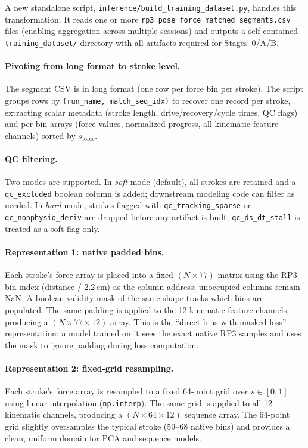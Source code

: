 \documentclass[11pt]{article}
\begin{document}
A new standalone script, \texttt{inference/build\_training\_dataset.py}, handles this transformation. It reads one or more \texttt{rp3\_pose\_force\_matched\_segments.csv} files (enabling aggregation across multiple sessions) and outputs a self-contained \texttt{training\_dataset/} directory with all artifacts required for Stages~0/A/B.

\paragraph{Pivoting from long format to stroke level.}
The segment CSV is in long format (one row per force bin per stroke). The script groups rows by \texttt{(run\_name, match\_seq\_idx)} to recover one record per stroke, extracting scalar metadata (stroke length, drive/recovery/cycle times, QC flags) and per-bin arrays (force values, normalized progress, all kinematic feature channels) sorted by $s_{\mathrm{force}}$.

\paragraph{QC filtering.}
Two modes are supported. In \emph{soft} mode (default), all strokes are retained and a \texttt{qc\_excluded} boolean column is added; downstream modeling code can filter as needed. In \emph{hard} mode, strokes flagged with \texttt{qc\_tracking\_sparse} or \texttt{qc\_nonphysio\_deriv} are dropped before any artifact is built; \texttt{qc\_ds\_dt\_stall} is treated as a soft flag only.

\paragraph{Representation 1: native padded bins.}
Each stroke's force array is placed into a fixed $(N \times 77)$ matrix using the RP3 bin index (distance / 2.2\,cm) as the column address; unoccupied columns remain NaN. A boolean validity mask of the same shape tracks which bins are populated. The same padding is applied to the 12 kinematic feature channels, producing a $(N \times 77 \times 12)$ array. This is the ``direct bins with masked loss'' representation: a model trained on it sees the exact native RP3 samples and uses the mask to ignore padding during loss computation.

\paragraph{Representation 2: fixed-grid resampling.}
Each stroke's force array is resampled to a fixed 64-point grid over $s \in [0, 1]$ using linear interpolation (\texttt{np.interp}). The same grid is applied to all 12 kinematic channels, producing a $(N \times 64 \times 12)$ sequence array. The 64-point grid slightly oversamples the typical stroke (59--68 native bins) and provides a clean, uniform domain for PCA and sequence models.
\end{document}
